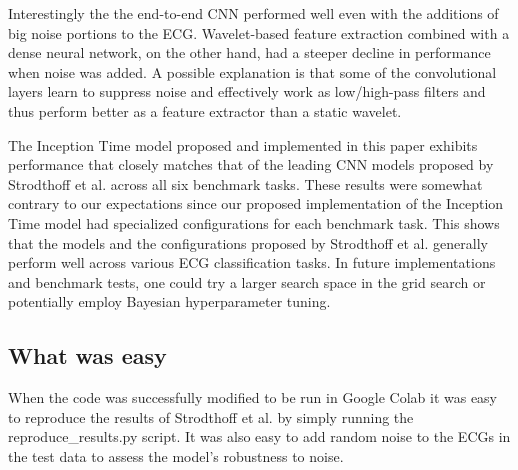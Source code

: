 Interestingly the the end-to-end CNN performed well even with the additions of big noise portions to the ECG. Wavelet-based feature extraction combined with a dense neural network, on the other hand, had a steeper decline in performance when noise was added. A possible explanation is that some of the convolutional layers learn to suppress noise and effectively work as low/high-pass filters and thus perform better as a feature extractor than a static wavelet.

The Inception Time model proposed and implemented in this paper exhibits performance that closely matches that of the leading CNN models proposed by Strodthoff et al. across all six benchmark tasks. These results were somewhat contrary to our expectations since our proposed implementation of the Inception Time model had specialized configurations for each benchmark task. This shows that the models and the configurations proposed by Strodthoff et al. generally perform well across various ECG classification tasks. In future implementations and benchmark tests, one could try a larger search space in the grid search or potentially employ Bayesian hyperparameter tuning.


\subsection{What was easy}


When the code was successfully modified to be run in Google Colab it was easy to reproduce the results of Strodthoff et al. by simply running the reproduce\_results.py script. It was also easy to add random noise to the ECGs in the test data to assess the model's robustness to noise.


